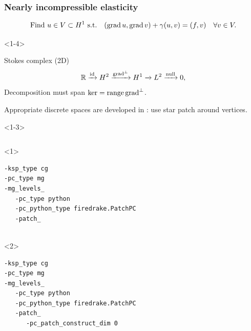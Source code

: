 \documentclass[presentation,aspectratio=43, 10pt]{beamer}
\DeclareMathOperator{\grad}{grad}
\let\div\relax
\DeclareMathOperator{\div}{div}
\DeclareMathOperator{\range}{range}
\begin{document}
\begin{frame}[fragile,t]
  \frametitle{Nearly incompressible elasticity}
  \vspace*{-1.5\baselineskip}
  \begin{equation*}
    \text{Find $u \in V \subset H^1$ s.t.} \quad (\grad u, \grad v) + \gamma (\div u, \div v) = (f, v) \quad \forall v \in V.
  \end{equation*}
  \vspace*{-\baselineskip}

  \begin{onlyenv}<1-4>
    \begin{block}{Stokes complex (2D)}
      \begin{equation*}
        \mathbb{R} \xrightarrow{\operatorname{id}} H^2
        \xrightarrow{\grad^\perp} H^1 \xrightarrow{\div} L^2 \xrightarrow{\operatorname{null}} 0,
      \end{equation*}
      Decomposition must span $\ker \div = \range \grad^\perp$.

      Appropriate discrete spaces are developed in \textcite{Morgan:1975}: use
      star patch around vertices.
    \end{block}
    \begin{onlyenv}<1-3>
      \begin{columns}[T]
        \begin{column}{0.6\textwidth}
          \begin{onlyenv}<1>
\begin{verbatim}
-ksp_type cg
-pc_type mg
-mg_levels_
   -pc_type python
   -pc_python_type firedrake.PatchPC
   -patch_


\end{verbatim}
          \end{onlyenv}
          \begin{onlyenv}<2>
\begin{verbatim}
-ksp_type cg
-pc_type mg
-mg_levels_
   -pc_type python
   -pc_python_type firedrake.PatchPC
   -patch_
      -pc_patch_construct_dim 0


\end{verbatim}
\end{onlyenv}
\end{column}
\end{columns}
\end{onlyenv}
\end{onlyenv}
\end{frame}
\end{document}
